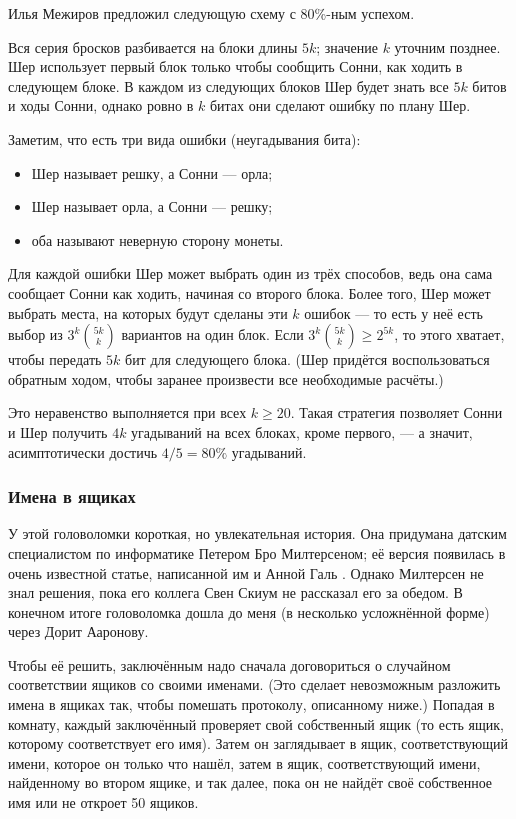 \begin{addedbytheeditors}
Илья Межиров предложил следующую схему с 80\%-ным успехом.

Вся серия бросков разбивается на блоки длины $5k$; значение $k$ уточним позднее.
Шер использует первый блок только чтобы сообщить Сонни, как ходить в следующем блоке.
В каждом из следующих блоков Шер будет знать все $5k$ битов и ходы Сонни,
однако ровно в $k$ битах они сделают ошибку по плану Шер. 

Заметим, что есть три вида ошибки (неугадывания бита): 
\begin{itemize}
\item Шер называет решку, а Сонни --- орла;
\item Шер называет орла, а Сонни --- решку;
\item оба называют неверную сторону монеты.
\end{itemize}
Для каждой ошибки Шер может выбрать один из трёх способов,
ведь она сама сообщает Сонни как ходить, начиная со второго блока.
Более того, Шер может выбрать места, на которых будут сделаны эти $k$ ошибок --- то есть
у неё есть выбор из $3^k \binom{5k}{k}$ вариантов на один блок.
Если $3^k \binom{5k}{k}\ge 2^{5k}$, то этого хватает, чтобы передать $5k$ бит для следующего блока.
(Шер придётся воспользоваться обратным ходом, чтобы заранее произвести все необходимые расчёты.)

Это неравенство выполняется при всех $k\ge 20$.
Такая стратегия позволяет Сонни и Шер получить $4k$ угадываний на всех блоках, кроме первого, --- а значит, асимптотически достичь $4/5=80\%$ угадываний.
\pr
\end{addedbytheeditors}


\subsubsection*{Имена в ящиках}

У этой головоломки короткая, но увлекательная история.
Она придумана датским специалистом по информатике Петером Бро Милтерсеном;
её версия появилась в очень известной статье, написанной им и Анной Галь \cite{21}.
Однако Милтерсен не знал  решения, пока его коллега Свен Скиум не рассказал его за обедом.
В конечном итоге головоломка дошла до меня (в несколько усложнённой форме) через Дорит Ааронову.

Чтобы её решить, заключённым надо сначала договориться о случайном соответствии ящиков со своими именами.
(Это сделает невозможным разложить имена в ящиках так, чтобы помешать протоколу, описанному ниже.)
Попадая в комнату, каждый заключённый проверяет свой собственный ящик (то есть ящик, которому соответствует его имя).
Затем он заглядывает в ящик, соответствующий имени, которое он только что нашёл,
затем в ящик, соответствующий имени, найденному во втором ящике, и так далее, пока он не найдёт своё собственное имя или не откроет 50 ящиков.


